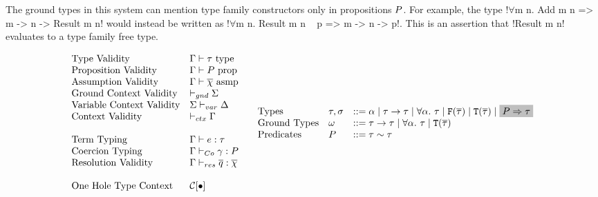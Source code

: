 \documentclass[format=acmsmall,manuscript,review,screen,nonacm,margin=1in,11pt]{acmart}
\begin{document}
The ground types in this system can mention type family constructors only in propositions $P$.
For example, the type !$\forall$m n. Add m n => m -> n -> Result m n! would instead be written
as !$\forall$m n. Result m n ~ p => m -> n -> p!. This is an assertion that !Result m n! evaluates to a
type family free type.

\begin{figure}[ht]
    \footnotesize
  \[
    \begin{array}{l l l}
      &\text{Type Validity}               &\ValidType \TEnv \tau\\
      &\text{Proposition Validity}        &\ValidProp \TEnv \Preds\\
      &\text{Assumption Validity}      &\ValidAssmp \TEnv {\many\chi}\\
      &\text{Ground Context Validity}     &\ValidGCtx{\GEnv}\\
      &\text{Variable Context Validity}   &\ValidVCtx\GEnv\VEnv\\
      &\text{Context Validity}            &\ValidCtx\TEnv\\
      \\
      &\text{Term Typing}              &\Typing \TEnv \Tm \tau\\
      &\text{Coercion Typing}          &\CoTyping \TEnv \Co \Preds\\
      &\text{Resolution Validity}      &\ResTyping \TEnv {\many q} {\many\chi}\\
      \\
      &\text{One Hole Type Context}    &\TEvalCtxt{\bullet}
    \end{array}
    \begin{array}{l l l l l}
      &\text{Types}           &\tau,\sigma  &\bnfeq \alpha \bnfor \tau\to\tau \bnfor \Forall\alpha\tau
                                              \bnfor \FamCtrs(\many\tau) \bnfor \TypeCtrs(\many\tau)
                                              \bnfor \text{\shaded{$\Preds\then\tau$}}&\\
      &\text{Ground Types}    &\GTy         &\bnfeq \tau\to\tau \bnfor \Forall\alpha\tau \bnfor \TypeCtrs(\many\tau)\\
      &\text{Predicates}      &\Preds       &\bnfeq \tau\teq\tau\\

\end{array}\]
\end{figure}
\end{document}
